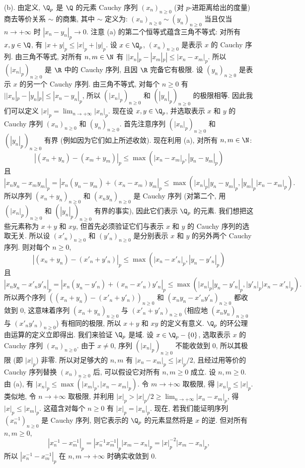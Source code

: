 \begin{solution}
(b). 由定义, $\Q_p$ 是 $\Q$ 的元素 Cauchy 序列 $(x_n)_{n \geq 0}$ (对 $p$-进距离给出的度量) 商去等价关系 $\sim$ 的商集, 其中 $\sim$ 定义为: $(x_n)_{n \geq 0} \sim (y_n)_{n \geq 0}$ 当且仅当 $n \to +\infty$ 时 $|x_n - y_n|_p \to 0$.
注意 (a) 的第二个恒等式蕴含三角不等式: 对所有 $x, y \in \Q$, 有 $|x + y|_p \leq |x|_p + |y|_p$.
设 $x \in \Q_p$, $(x_n)_{n \geq 0}$ 是表示 $x$ 的 Cauchy 序列. 由三角不等式, 对所有 $n, m \in \N$ 有 $||x_n|_p - |x_m|_p| \leq |x_n - x_m|_p$. 所以 $(|x_n|_p)_{n \geq 0}$ 是 $\R$ 中的 Cauchy 序列, 且因 $\R$ 完备它有极限. 设 $(y_n)_{n \geq 0}$ 是表示 $x$ 的另一个 Cauchy 序列. 由三角不等式, 对每个 $n \geq 0$ 有 $||x_n|_p - |y_n|_p| \leq |x_n - y_n|_p$, 所以 $(|x_n|_p)_{n \geq 0}$ 和 $(|y_n|_p)_{n \geq 0}$ 的极限相等. 因此我们可以定义 $|x|_p = \lim_{n \to +\infty}|x_n|_p$.
现在设 $x, y \in \Q_p$, 并选取表示 $x$ 和 $y$ 的 Cauchy 序列 $(x_n)_{n \geq 0}$ 和 $(y_n)_{n \geq 0}$. 首先注意序列 $(|x_n|_p)_{n \geq 0}$ 和 $(|y_n|_p)_{n \geq 0}$ 有界 (例如因为它们如上所述收敛). 现在利用 (a), 对所有 $n, m \in \N$:
\[
|(x_n + y_n) - (x_m + y_m)|_p \leq \max(|x_n - x_m|_p, |y_n - y_m|_p)
\]
且
\[
|x_ny_n - x_my_m|_p = |x_n(y_n - y_m) + (x_n - x_m)y_m|_p \leq \max(|x_n|_p|y_n - y_m|_p, |y_m|_p|x_n - x_m|_p).
\]
所以序列 $(x_n + y_n)_{n \geq 0}$ 和 $(x_ny_n)_{n \geq 0}$ 是 Cauchy 序列 (对第二个, 用 $(|x_n|_p)_{n \geq 0}$ 和 $(|y_n|_p)_{n \geq 0}$ 有界的事实), 因此它们表示 $\Q_p$ 的元素. 我们想把这些元素称为 $x + y$ 和 $xy$, 但首先必须验证它们与表示 $x$ 和 $y$ 的 Cauchy 序列的选取无关. 所以设 $(x'_n)_{n \geq 0}$ 和 $(y'_n)_{n \geq 0}$ 是分别表示 $x$ 和 $y$ 的另外两个 Cauchy 序列. 则对每个 $n \geq 0$,
\[
|(x_n + y_n) - (x'_n + y'_n)|_p \leq \max(|x_n - x'_n|_p, |y_n - y'_n|_p)
\]
且
\[
|x_ny_n - x'_ny'_n|_p = |x_n(y_n - y'_n) + (x_n - x'_n)y'_n|_p \leq \max(|x_n|_p|y_n - y'_n|_p, |y'_n|_p|x_n - x'_n|_p).
\]
所以两个序列 $((x_n + y_n) - (x'_n + y'_n))_{n \geq 0}$ 和 $(x_ny_n - x'_ny'_n)_{n \geq 0}$ 都收敛到 $0$, 这意味着序列 $(x_n + y_n)_{n \geq 0}$ 与 $(x'_n + y'_n)_{n \geq 0}$ (相应地 $(x_ny_n)_{n \geq 0}$ 与 $(x'_ny'_n)_{n \geq 0}$) 有相同的极限, 所以 $x + y$ 和 $xy$ 的定义有意义.
$\Q_p$ 的环公理由运算的定义立即得出. 我们来验证 $\Q_p$ 是域. 设 $x \in \Q_p - \{0\}$, 选取表示 $x$ 的 Cauchy 序列 $(x_n)_{n \geq 0}$. 由于 $x \neq 0$, 序列 $(|x_n|_p)_{n \geq 0}$ 不能收敛到 $0$, 所以其极限 (即 $|x|_p$) 非零. 所以对足够大的 $n, m$ 有 $|x_n - x_m|_p \leq |x|_p/2$, 且经过用等价的 Cauchy 序列替换 $(x_n)_{n \geq 0}$ 后, 可以假设它对所有 $n, m \geq 0$ 成立. 设 $n, m \geq 0$. 由 (a), 有 $|x_n|_p \leq \max(|x_m|_p, |x_n - x_m|_p)$. 令 $m \to +\infty$ 取极限, 得 $|x_n|_p \leq |x|_p$. 类似地, 令 $n \to +\infty$ 取极限, 并利用 $|x|_p > |x|_p/2 \geq \lim_{n \to +\infty}|x_n - x_m|_p$, 得 $|x|_p \leq |x_m|_p$. 这蕴含对每个 $n \geq 0$ 有 $|x|_p = |x_n|_p$. 现在, 若我们能证明序列 $(x_n^{-1})_{n \geq 0}$ 是 Cauchy 序列, 则它表示的 $\Q_p$ 的元素显然将是 $x$ 的逆. 但对所有 $n, m \geq 0$,
\[
|x_n^{-1} - x_m^{-1}|_p = |x_n^{-1}x_m^{-1}|_p|x_m - x_n|_p = |x|_p^{-2}|x_m - x_n|_p,
\]
所以 $|x_n^{-1} - x_m^{-1}|_p$ 在 $n, m \to +\infty$ 时确实收敛到 $0$.


\end{solution}

